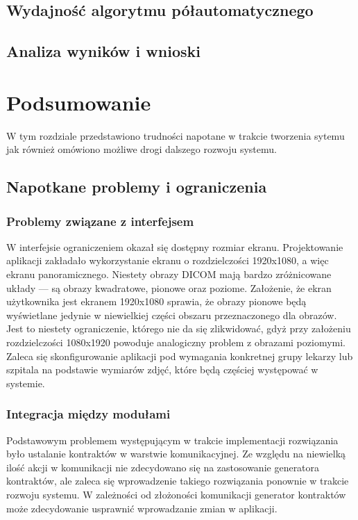 \documentclass[a4paper,11pt,twoside]{report}
\theoremstyle{definition}
\begin{document}
\section {Wydajność algorytmu półautomatycznego}

\section {Analiza wyników i wnioski}


\chapter {Podsumowanie}

W tym rozdziale przedstawiono trudności napotane w trakcie tworzenia sytemu jak również omówiono możliwe drogi dalszego rozwoju systemu.

\section {Napotkane problemy i ograniczenia}

\subsection {Problemy związane z interfejsem}

W interfejsie ograniczeniem okazał się dostępny rozmiar ekranu. Projektowanie aplikacji zakładało wykorzystanie ekranu o rozdzielczości 1920x1080, a więc ekranu panoramicznego. Niestety obrazy DICOM mają bardzo zróżnicowane układy --- są obrazy kwadratowe, pionowe oraz poziome. Założenie, że ekran użytkownika jest ekranem 1920x1080 sprawia, że obrazy pionowe będą wyświetlane jedynie w niewielkiej części obszaru przeznaczonego dla obrazów. Jest to niestety ograniczenie, którego nie da się zlikwidować, gdyż przy założeniu rozdzielczości 1080x1920 powoduje analogiczny problem z obrazami poziomymi. Zaleca się skonfigurowanie aplikacji pod wymagania konkretnej grupy lekarzy lub szpitala na podstawie wymiarów zdjęć, które będą częściej występować w systemie.

\subsection {Integracja między modułami}

Podstawowym problemem występującym w trakcie implementacji rozwiązania było ustalanie kontraktów w warstwie komunikacyjnej. Ze względu na niewielką ilość akcji w komunikacji nie zdecydowano się na zastosowanie generatora kontraktów, ale zaleca się wprowadzenie takiego rozwiązania ponownie w trakcie rozwoju systemu. W zależności od złożoności komunikacji generator kontraktów może zdecydowanie usprawnić wprowadzanie zmian w aplikacji. 
\end{document}
